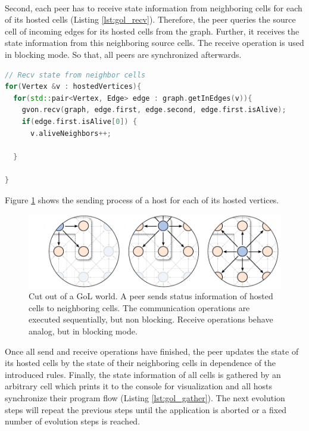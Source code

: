 \paragraph*{}
Second, each peer has to receive state information from neighboring
cells for each of its hosted cells (Listing
\ref{lst:gol_recv}). Therefore, the peer queries the source cell of
incoming edges for its hosted cells from the graph. Further, it
receives the state information from this neighboring source cells.
The receive operation is used in blocking mode. So that, all peers
are synchronized afterwards.

\begin{lstlisting}[language=C++, label=lst:gol_recv, caption={\ }]
// Recv state from neighbor cells
for(Vertex &v : hostedVertices){
  for(std::pair<Vertex, Edge> edge : graph.getInEdges(v)){
    gvon.recv(graph, edge.first, edge.second, edge.first.isAlive);
    if(edge.first.isAlive[0]) { 
      v.aliveNeighbors++;

  }

}
\end{lstlisting}

Figure \ref{fig:gol_communication} shows the sending process of a host
for each of its hosted vertices.

\begin{figure}[H]
  \centering
  \includegraphics[width=\textwidth]{graphics/40_gol_communication}
  \caption{Cut out of a GoL world. A peer sends status information of
    hosted cells to neighboring cells. The communication operations
    are executed sequentially, but non blocking. Receive operations
    behave analog, but in blocking mode.}
  \label{fig:gol_communication}
\end{figure}

Once all send and receive operations have finished, the peer updates
the state of its hosted cells by the state of their neighboring cells
in dependence of the introduced rules. Finally, the state information
of all cells is gathered by an arbitrary cell which prints it to the
console for visualization and all hosts synchronize their program flow
(Listing \ref{lst:gol_gather}). The next evolution steps will repeat the
previous steps until the application is aborted or a fixed number of
evolution steps is reached.

